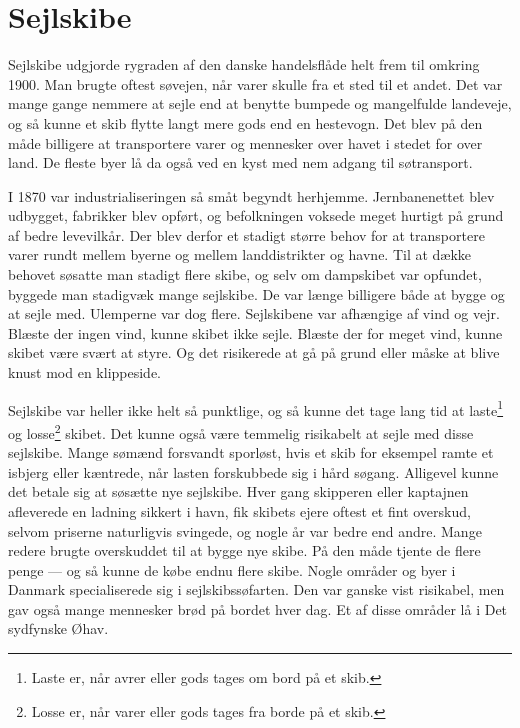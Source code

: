 \part{Sejlskibe}\label{sejlskibe}

Sejlskibe udgjorde rygraden af den danske handelsflåde helt frem til
omkring 1900. Man brugte oftest søvejen, når varer skulle fra et sted
til et andet. Det var mange gange nemmere at sejle end at benytte
bumpede og mangelfulde landeveje, og så kunne et skib flytte langt mere
gods end en hestevogn. Det blev på den måde billigere at transportere
varer og mennesker over havet i stedet for over land. De fleste byer lå
da også ved en kyst med nem adgang til søtransport.

I 1870 var industrialiseringen så småt begyndt herhjemme. Jernbanenettet
blev udbygget, fabrikker blev opført, og befolkningen voksede meget
hurtigt på grund af bedre levevilkår. Der blev derfor et stadigt større
behov for at transportere varer rundt mellem byerne og mellem
landdistrikter og havne. Til at dække behovet søsatte man stadigt flere
skibe, og selv om dampskibet var opfundet, byggede man stadigvæk mange
sejlskibe. De var længe billigere både at bygge og at sejle med.
Ulemperne var dog flere. Sejlskibene var afhængige af vind og vejr.
Blæste der ingen vind, kunne skibet ikke sejle. Blæste der for meget
vind, kunne skibet være svært at styre. Og det risikerede at gå på grund
eller måske at blive knust mod en klippeside.

Sejlskibe var heller ikke helt så punktlige, og så kunne det tage lang
tid at laste\footnote{Laste er, når avrer eller gods tages om bord på et
  skib.} og losse\footnote{Losse er, når varer eller gods tages fra
  borde på et skib.} skibet. Det kunne også være temmelig risikabelt at
sejle med disse sejlskibe. Mange sømænd forsvandt sporløst, hvis et skib
for eksempel ramte et isbjerg eller kæntrede, når lasten forskubbede sig
i hård søgang. Alligevel kunne det betale sig at søsætte nye sejlskibe.
Hver gang skipperen eller kaptajnen afleverede en ladning sikkert i
havn, fik skibets ejere oftest et fint overskud, selvom priserne
naturligvis svingede, og nogle år var bedre end andre. Mange redere
brugte overskuddet til at bygge nye skibe. På den måde tjente de flere
penge --- og så kunne de købe endnu flere skibe. Nogle områder og byer i
Danmark specialiserede sig i sejlskibssøfarten. Den var ganske vist
risikabel, men gav også mange mennesker brød på bordet hver dag. Et af
disse områder lå i Det sydfynske Øhav.
